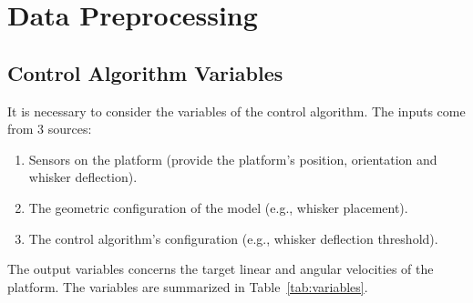 \section{Data Preprocessing}

\subsection{Control Algorithm Variables}

It is necessary to consider the variables of the control algorithm.
The inputs come from 3 sources:
\begin{enumerate}
    \item Sensors on the platform (provide the platform's position, orientation and whisker deflection).
    \item The geometric configuration of the model (e.g., whisker placement).
    \item The control algorithm's configuration (e.g., whisker deflection threshold).
\end{enumerate}
The output variables concerns the target linear and angular velocities of the platform.
The variables are summarized in Table~\ref{tab:variables}.

\newcommand{\branch}[3]{%
    \scalebox{0.75}{$\left\{
                         \begin{array}{@{}l@{\quad}l@{}}
                             #2, & \text{if } #1,\\[0.5em]
                             #3, & \text{otherwise.}
                         \end{array}
    \right.$}%
}


